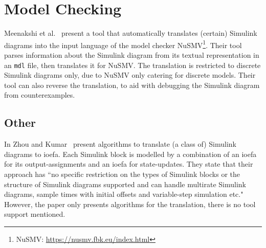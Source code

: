 \section{Model Checking}
\label{sec:modelChecking}

Meenakshi et al.~\cite{meenakshi_tool_2006} present a tool that automatically translates (certain) Simulink diagrams into the input language of the model checker NuSMV\footnote{NuSMV: \url{https://nusmv.fbk.eu/index.html}}. Their tool parses information about the Simulink diagram from its textual representation in an \texttt{mdl} file, then translates it for NuSMV. The translation is restricted to discrete Simulink diagrams only, due to NuSMV only catering for discrete models. Their tool can also reverse the translation, to aid with debugging the Simulink diagram from counterexamples. 

\subsection{Other}

In Zhou and Kumar~\cite{zhou_semantic_2012} present algorithms to translate (a class of) Simulink diagrams to \gls{ioefa}. Each Simulink block is modelled by a combination of an \gls{ioefa} for its output-assignments and an \gls{ioefa} for state-updates. They state that their approach has ``no specific restriction on the types of Simulink blocks or the structure of Simulink diagrams supported and can handle multirate Simulink diagrams, sample times with initial offsets and variable-step simulation etc." However, the paper only presents algorithms for the translation, there is no tool support mentioned.
